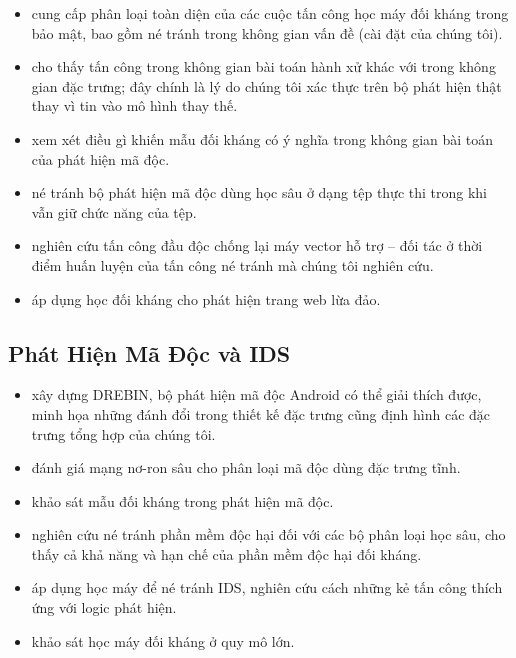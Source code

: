 \documentclass[12pt,a4paper]{report}
\begin{document}
\begin{itemize}
  \item \citet{demetrio2021adversarial} cung cấp phân loại toàn diện của các cuộc tấn công học máy đối kháng trong bảo mật, bao gồm né tránh trong không gian vấn đề (cài đặt của chúng tôi).
  
  \item \citet{demetrio2020intriguing} cho thấy tấn công trong không gian bài toán hành xử khác với trong không gian đặc trưng; đây chính là lý do chúng tôi xác thực trên bộ phát hiện thật thay vì tin vào mô hình thay thế.
  
  \item \citet{pierazzi2019intriguing} xem xét điều gì khiến mẫu đối kháng có ý nghĩa trong không gian bài toán của phát hiện mã độc.
  
  \item \citet{demetrio2019adversarial} né tránh bộ phát hiện mã độc dùng học sâu ở dạng tệp thực thi trong khi vẫn giữ chức năng của tệp.
  
  \item \citet{melis2016poisoning} nghiên cứu tấn công đầu độc chống lại máy vector hỗ trợ -- đối tác ở thời điểm huấn luyện của tấn công né tránh mà chúng tôi nghiên cứu.
  
  \item \citet{anderson2018deep} áp dụng học đối kháng cho phát hiện trang web lừa đảo.
\end{itemize}

\subsection{Phát Hiện Mã Độc và IDS}

\begin{itemize}
  \item \citet{arp2016drebin} xây dựng DREBIN, bộ phát hiện mã độc Android có thể giải thích được, minh họa những đánh đổi trong thiết kế đặc trưng cũng định hình các đặc trưng tổng hợp của chúng tôi.
  
  \item \citet{saxe2015deep} đánh giá mạng nơ-ron sâu cho phân loại mã độc dùng đặc trưng tĩnh.
  
  \item \citet{severi2018exploring} khảo sát mẫu đối kháng trong phát hiện mã độc.
  
  \item \citet{mosli2018towards} nghiên cứu né tránh phần mềm độc hại đối với các bộ phân loại học sâu, cho thấy cả khả năng và hạn chế của phần mềm độc hại đối kháng.
  
  \item \citet{silva2017ids} áp dụng học máy để né tránh IDS, nghiên cứu cách những kẻ tấn công thích ứng với logic phát hiện.
  
  \item \citet{reuben2021adversarial} khảo sát học máy đối kháng ở quy mô lớn.
\end{itemize}
\end{document}
